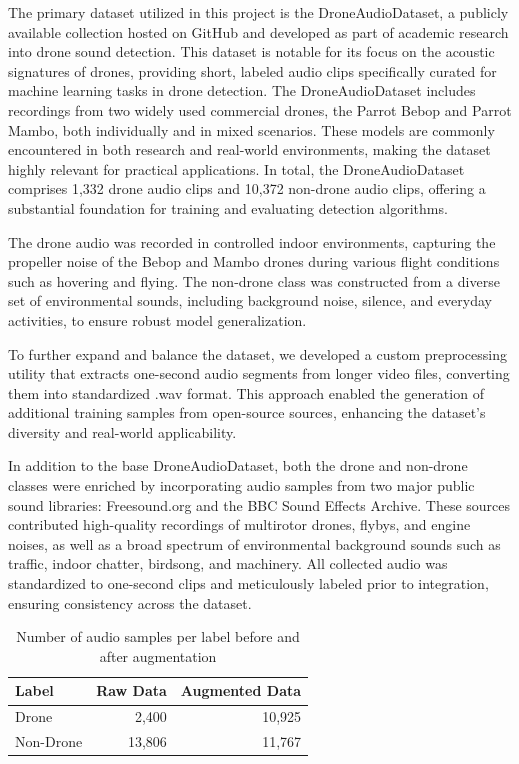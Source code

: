 \documentclass[12pt]{article}
\begin{document}
{\fontsize{9}{11}\selectfont
\indent The primary dataset utilized in this project is the DroneAudioDataset,\cite{AlEmadi2019Audio} a publicly available collection hosted on GitHub and developed as part of academic research into drone sound detection. This dataset is notable for its focus on the acoustic signatures of drones, providing short, labeled audio clips specifically curated for machine learning tasks in drone detection. The DroneAudioDataset includes recordings from two widely used commercial drones, the Parrot Bebop and Parrot Mambo, both individually and in mixed scenarios. These models are commonly encountered in both research and real-world environments, making the dataset highly relevant for practical applications. In total, the DroneAudioDataset comprises 1,332 drone audio clips and 10,372 non-drone audio clips, offering a substantial foundation for training and evaluating detection algorithms.

The drone audio was recorded in controlled indoor environments, capturing the propeller noise of the Bebop and Mambo drones during various flight conditions such as hovering and flying. The non-drone class was constructed from a diverse set of environmental sounds, including background noise, silence, and everyday activities, to ensure robust model generalization.

To further expand and balance the dataset, we developed a custom preprocessing utility that extracts one-second audio segments from longer video files, converting them into standardized .wav format. This approach enabled the generation of additional training samples from open-source sources, enhancing the dataset's diversity and real-world applicability.

In addition to the base DroneAudioDataset, both the drone and non-drone classes were enriched by incorporating audio samples from two major public sound libraries: Freesound.org\cite{freesound} and the BBC Sound Effects Archive\cite{bbc_sfx}. These sources contributed high-quality recordings of multirotor drones, flybys, and engine noises, as well as a broad spectrum of environmental background sounds such as traffic, indoor chatter, birdsong, and machinery. All collected audio was standardized to one-second clips and meticulously labeled prior to integration, ensuring consistency across the dataset.

\begin{table}[ht]
\centering
{\scriptsize
{}
\begin{tabular}{lrr}
\toprule
\rowcolor{gray!30}
Label & Raw Data & Augmented Data \\
\midrule
Drone      & 2,400  & 10,925 \\
Non-Drone  & 13,806 & 11,767 \\
\bottomrule
\end{tabular}
}
\caption{Number of audio samples per label before and after augmentation}
\label{tab:audio_label_counts}
\end{table}

}
\end{document}
